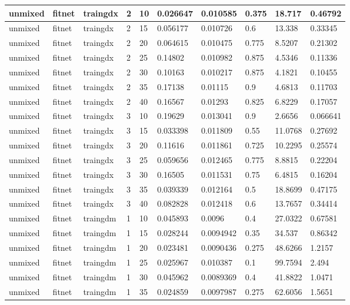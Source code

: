 \begin{longtable}{lllllllll}
unmixed & fitnet & traingdx & 2 & 10 & 0.026647 & 0.010585 & 0.375 & 18.717 & 0.46792 \\ \hline 
unmixed & fitnet & traingdx & 2 & 15 & 0.056177 & 0.010726 & 0.6 & 13.338 & 0.33345 \\ \hline 
unmixed & fitnet & traingdx & 2 & 20 & 0.064615 & 0.010475 & 0.775 & 8.5207 & 0.21302 \\ \hline 
unmixed & fitnet & traingdx & 2 & 25 & 0.14802 & 0.010982 & 0.875 & 4.5346 & 0.11336 \\ \hline 
unmixed & fitnet & traingdx & 2 & 30 & 0.10163 & 0.010217 & 0.875 & 4.1821 & 0.10455 \\ \hline 
unmixed & fitnet & traingdx & 2 & 35 & 0.17138 & 0.01115 & 0.9 & 4.6813 & 0.11703 \\ \hline 
unmixed & fitnet & traingdx & 2 & 40 & 0.16567 & 0.01293 & 0.825 & 6.8229 & 0.17057 \\ \hline 
unmixed & fitnet & traingdx & 3 & 10 & 0.19629 & 0.013041 & 0.9 & 2.6656 & 0.066641 \\ \hline 
unmixed & fitnet & traingdx & 3 & 15 & 0.033398 & 0.011809 & 0.55 & 11.0768 & 0.27692 \\ \hline 
unmixed & fitnet & traingdx & 3 & 20 & 0.11616 & 0.011861 & 0.725 & 10.2295 & 0.25574 \\ \hline 
unmixed & fitnet & traingdx & 3 & 25 & 0.059656 & 0.012465 & 0.775 & 8.8815 & 0.22204 \\ \hline 
unmixed & fitnet & traingdx & 3 & 30 & 0.16505 & 0.011531 & 0.75 & 6.4815 & 0.16204 \\ \hline 
unmixed & fitnet & traingdx & 3 & 35 & 0.039339 & 0.012164 & 0.5 & 18.8699 & 0.47175 \\ \hline 
unmixed & fitnet & traingdx & 3 & 40 & 0.082828 & 0.012418 & 0.6 & 13.7657 & 0.34414 \\ \hline 
unmixed & fitnet & traingdm & 1 & 10 & 0.045893 & 0.0096 & 0.4 & 27.0322 & 0.67581 \\ \hline 
unmixed & fitnet & traingdm & 1 & 15 & 0.028244 & 0.0094942 & 0.35 & 34.537 & 0.86342 \\ \hline 
unmixed & fitnet & traingdm & 1 & 20 & 0.023481 & 0.0090436 & 0.275 & 48.6266 & 1.2157 \\ \hline 
unmixed & fitnet & traingdm & 1 & 25 & 0.025967 & 0.010387 & 0.1 & 99.7594 & 2.494 \\ \hline 
unmixed & fitnet & traingdm & 1 & 30 & 0.045962 & 0.0089369 & 0.4 & 41.8822 & 1.0471 \\ \hline 
unmixed & fitnet & traingdm & 1 & 35 & 0.024859 & 0.0097987 & 0.275 & 62.6056 & 1.5651 \\ \hline 

\end{longtable}
